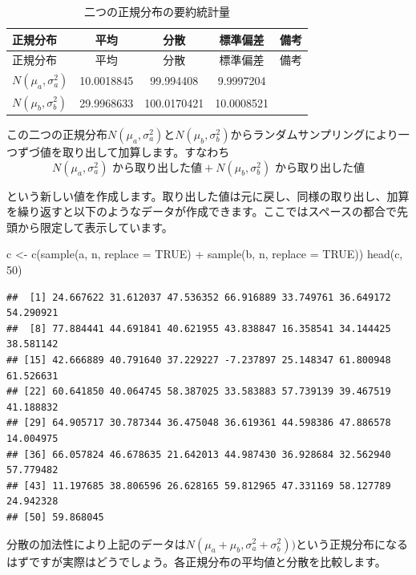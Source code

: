 \documentclass[]{tufte-handout}
\newenvironment{Shaded}{}{}
\newcommand{\AttributeTok}[1]{\textcolor[rgb]{0.49,0.56,0.16}{#1}}
\newcommand{\ConstantTok}[1]{\textcolor[rgb]{0.53,0.00,0.00}{#1}}
\newcommand{\DecValTok}[1]{\textcolor[rgb]{0.25,0.63,0.44}{#1}}
\newcommand{\FunctionTok}[1]{\textcolor[rgb]{0.02,0.16,0.49}{#1}}
\newcommand{\NormalTok}[1]{#1}
\newcommand{\OtherTok}[1]{\textcolor[rgb]{0.00,0.44,0.13}{#1}}
\newcommand{\SpecialCharTok}[1]{\textcolor[rgb]{0.25,0.44,0.63}{#1}}
\begin{document}
\begin{longtable}[]{@{}lcccl@{}}
\caption{二つの正規分布の要約統計量}\tabularnewline
\toprule
正規分布 & 平均 & 分散 & 標準偏差 & 備考 \\
\midrule
\endfirsthead
\toprule
正規分布 & 平均 & 分散 & 標準偏差 & 備考 \\
\midrule
\endhead
\(N(\mu_a, \sigma^2_a)\) & 10.0018845 & 99.994408 & 9.9997204 & \\
\(N(\mu_b, \sigma^2_b)\) & 29.9968633 & 100.0170421 & 10.0008521 & \\
\bottomrule
\end{longtable}

この二つの正規分布\(N(\mu_a, \sigma^2_a)\)と\(N(\mu_b,\sigma^2_b)\)からランダムサンプリングにより一つずづ値を取り出して加算します。すなわち
　
\[N(\mu_a, \sigma^2_a)\mbox{ から取り出した値} + N(\mu_b,\sigma^2_b)\mbox{ から取り出した値}\]

という新しい値を作成します。取り出した値は元に戻し、同様の取り出し、加算を繰り返すと以下のようなデータが作成できます。ここではスペースの都合で先頭から限定して表示しています。

\begin{Shaded}
\begin{Highlighting}[numbers=left,,]
\NormalTok{c }\OtherTok{\textless{}{-}} \FunctionTok{c}\NormalTok{(}\FunctionTok{sample}\NormalTok{(a, n, }\AttributeTok{replace =} \ConstantTok{TRUE}\NormalTok{) }\SpecialCharTok{+} \FunctionTok{sample}\NormalTok{(b, n, }\AttributeTok{replace =} \ConstantTok{TRUE}\NormalTok{))}
\FunctionTok{head}\NormalTok{(c, }\DecValTok{50}\NormalTok{)}
\end{Highlighting}
\end{Shaded}

\begin{verbatim}
##  [1] 24.667622 31.612037 47.536352 66.916889 33.749761 36.649172 54.290921
##  [8] 77.884441 44.691841 40.621955 43.838847 16.358541 34.144425 38.581142
## [15] 42.666889 40.791640 37.229227 -7.237897 25.148347 61.800948 61.526631
## [22] 60.641850 40.064745 58.387025 33.583883 57.739139 39.467519 41.188832
## [29] 64.905717 30.787344 36.475048 36.619361 44.598386 47.886578 14.004975
## [36] 66.057824 46.678635 21.642013 44.987430 36.928684 32.562940 57.779482
## [43] 11.197685 38.806596 26.628165 59.812965 47.331169 58.127789 24.942328
## [50] 59.868045
\end{verbatim}

分散の加法性により上記のデータは\(N(\mu_a + \mu_b, \sigma^2_a + \sigma^2_b))\)という正規分布になるはずですが実際はどうでしょう。各正規分布の平均値と分散を比較します。
\end{document}
